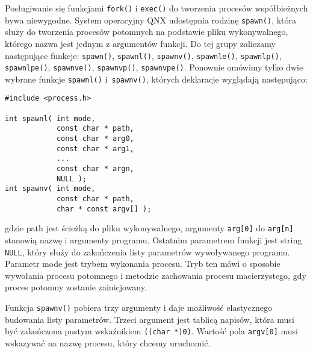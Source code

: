 Posługiwanie się funkcjami \texttt{fork()} i \texttt{exec()} do tworzenia
procesów współbieżnych bywa niewygodne. System operacyjny QNX udostępnia
rodzinę \texttt{spawn()}, która służy do tworzenia procesów potomnych na
podstawie pliku wykonywalnego, którego nazwa jest jednym z argumentów funkcji.
Do tej grupy zaliczamy następujące funkcje: \texttt{spawn()},
\texttt{spawnl()}, \texttt{spawnv()}, \texttt{spawnle()}, \texttt{spawnlp()},
\texttt{spawnlpe()}, \texttt{spawnve()}, \texttt{spawnvp()},
\texttt{spawnvpe()}. Ponownie omówimy tylko dwie wybrane funkcje
\texttt{spawnl()} i~\texttt{spawnv()}, których deklaracje wyglądają
następująco:

\begin{lstlisting}[style=MyCStyle]
#include <process.h>

int spawnl( int mode,
            const char * path,
            const char * arg0,
            const char * arg1,
            ...
            const char * argn,
            NULL );
int spawnv( int mode,
            const char * path,
            char * const argv[] );
\end{lstlisting}
gdzie path jest ścieżką do pliku wykonywalnego, argumenty \texttt{arg[0]} do
\texttt{arg[n]} stanowią nazwę i argumenty programu. Ostatnim parametrem
funkcji jest string \texttt{NULL}, który służy do zakończenia listy parametrów
wywoływanego programu. Parametr mode jest trybem wykonania procesu. Tryb ten
mówi o sposobie wywołania procesu potomnego i metodzie zachowania procesu
macierzystego, gdy proces potomny zostanie zainicjowany.

Funkcja \texttt{spawnv()} pobiera trzy argumenty i daje możliwość elastycznego
budowania listy parametrów. Trzeci argument jest tablicą napisów, która musi być
zakończona pustym wskaźnikiem \texttt{((char *)0)}. Wartość pola
\texttt{argv[0]} musi wskazywać na nazwę procesu, który chcemy uruchomić.

